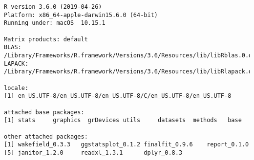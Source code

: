 \documentclass[]{article}
\begin{document}
\begin{verbatim}
R version 3.6.0 (2019-04-26)
Platform: x86_64-apple-darwin15.6.0 (64-bit)
Running under: macOS  10.15.1

Matrix products: default
BLAS:   /Library/Frameworks/R.framework/Versions/3.6/Resources/lib/libRblas.0.dylib
LAPACK: /Library/Frameworks/R.framework/Versions/3.6/Resources/lib/libRlapack.dylib

locale:
[1] en_US.UTF-8/en_US.UTF-8/en_US.UTF-8/C/en_US.UTF-8/en_US.UTF-8

attached base packages:
[1] stats     graphics  grDevices utils     datasets  methods   base     

other attached packages:
[1] wakefield_0.3.3   ggstatsplot_0.1.2 finalfit_0.9.6    report_0.1.0     
[5] janitor_1.2.0     readxl_1.3.1      dplyr_0.8.3      


\end{verbatim}
\end{document}

